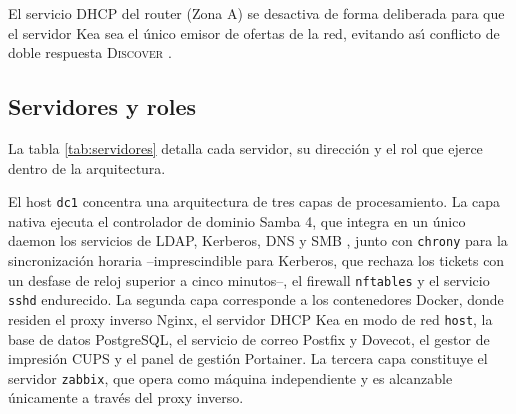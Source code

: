 El servicio DHCP del router (Zona A) se desactiva de forma deliberada para
que el servidor Kea sea el \'unico emisor de ofertas de la red, evitando as\'\i
conflicto de doble respuesta \textsc{Discover} \cite{rfc2131}.

\subsection{Servidores y roles}

La tabla \ref{tab:servidores} detalla cada servidor, su direcci\'on y el rol
que ejerce dentro de la arquitectura.

\begin{table}[H]
\centering
\caption{Servidores, direcciones y roles en la arquitectura final}
\label{tab:servidores}
\end{table}

El host \texttt{dc1} concentra una arquitectura de tres capas de
procesamiento. La capa nativa ejecuta el controlador de dominio Samba 4, que
integra en un \'unico daemon los servicios de LDAP, Kerberos, DNS y SMB
\cite{sambateam2024}, junto con \texttt{chrony} para la sincronizaci\'on
horaria --imprescindible para Kerberos, que rechaza los tickets con un
desfase de reloj superior a cinco minutos--, el firewall \texttt{nftables} y el servicio
\texttt{sshd} endurecido. La segunda capa corresponde a los contenedores
Docker, donde residen el proxy inverso Nginx, el servidor DHCP Kea en modo
de red \texttt{host}, la base de datos PostgreSQL, el servicio de correo
Postfix y Dovecot, el gestor de impresi\'on CUPS y el panel de gesti\'on
Portainer. La tercera capa constituye el servidor \texttt{zabbix}, que
opera como m\'aquina independiente y es alcanzable \'unicamente a trav\'es
del proxy inverso.

